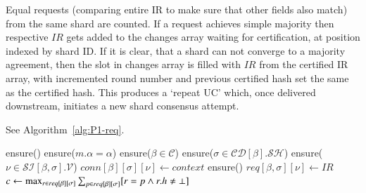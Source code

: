 Equal requests (comparing entire IR to make sure that other fields also match) from the same shard are counted. If a request achieves simple majority then respective $IR$ gets added to the changes array waiting for certification, at position indexed by shard ID. If it is clear, that a shard can not converge to a majority agreement, then the slot in changes array is filled with $IR$ from the certified IR array, with incremented round number and previous certified hash set the same as the certified hash. This produces a `repeat UC' which, once delivered downstream, initiates a new shard consensus attempt.

See Algorithm~\ref{alg:P1-req}.

\begin{algorithm}
  \caption{CR Message Handling.}\label{alg:P1-req}
  \begin{algorithmic}[0]
      \State ensure()
      \State ensure($m.\alpha = \alpha$)                           
      \State ensure($\beta \in \mathcal{C}$)                       
      \State ensure($\sigma \in \mathcal{CD}[\beta].\mathcal{SH}$) 
      \State ensure($\nu \in \mathcal{SI}[\beta, \sigma].\mathcal{V}$) 
      \State $conn[\beta][\sigma][\nu] \gets context$         
         
        \State {}
        \State \Return
      \EndIf
         
        \State \Return
      \EndIf
      \State ensure()
      \State $req[\beta, \sigma][\nu] \gets IR$  
      \State $c \gets \max_{r \in req[\beta][\sigma]} \sum_{p \in  req[\beta][\sigma]}[r=p \land r.h \ne \bot]$  

\end{algorithmic}
\end{algorithm}
